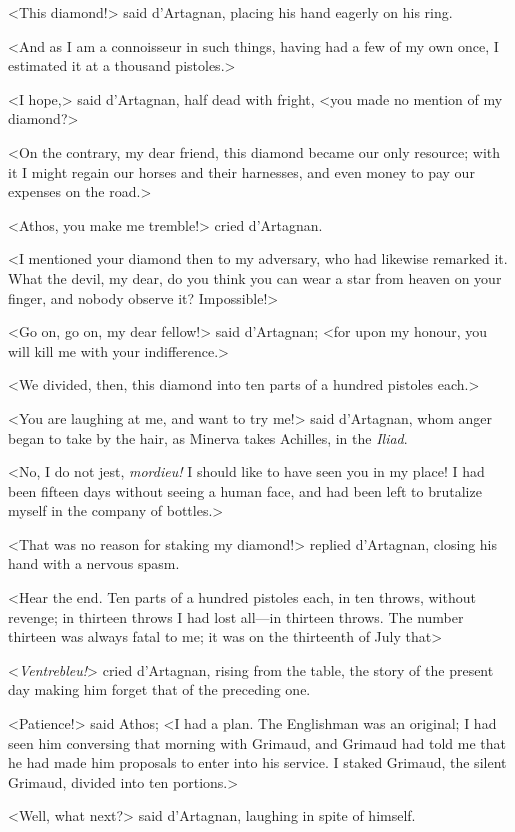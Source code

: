 <This diamond!> said d'Artagnan, placing his hand eagerly on his ring. 

<And as I am a connoisseur in such things, having had a few of my own once, I estimated it at a thousand pistoles.> 

<I hope,> said d'Artagnan, half dead with fright, <you made no mention of my diamond?> 

<On the contrary, my dear friend, this diamond became our only resource; with it I might regain our horses and their harnesses, and even money to pay our expenses on the road.> 

<Athos, you make me tremble!> cried d'Artagnan. 

<I mentioned your diamond then to my adversary, who had likewise remarked it. What the devil, my dear, do you think you can wear a star from heaven on your finger, and nobody observe it? Impossible!> 

<Go on, go on, my dear fellow!> said d'Artagnan; <for upon my honour, you will kill me with your indifference.> 

<We divided, then, this diamond into ten parts of a hundred pistoles each.> 

<You are laughing at me, and want to try me!> said d'Artagnan, whom anger began to take by the hair, as Minerva takes Achilles, in the \textit{Iliad}. 

<No, I do not jest, \textit{mordieu!} I should like to have seen you in my place! I had been fifteen days without seeing a human face, and had been left to brutalize myself in the company of bottles.> 

<That was no reason for staking my diamond!> replied d'Artagnan, closing his hand with a nervous spasm. 

<Hear the end. Ten parts of a hundred pistoles each, in ten throws, without revenge; in thirteen throws I had lost all---in thirteen throws. The number thirteen was always fatal to me; it was on the thirteenth of July that\longdash> 

<\textit{Ventrebleu!}> cried d'Artagnan, rising from the table, the story of the present day making him forget that of the preceding one. 

<Patience!> said Athos; <I had a plan. The Englishman was an original; I had seen him conversing that morning with Grimaud, and Grimaud had told me that he had made him proposals to enter into his service. I staked Grimaud, the silent Grimaud, divided into ten portions.> 

<Well, what next?> said d'Artagnan, laughing in spite of himself. 

